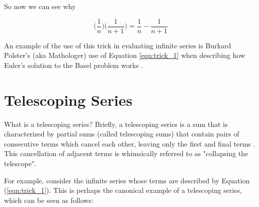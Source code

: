 \documentclass{article}
\theoremstyle{definition}
\begin{document}
\bigskip
\noindent
So now we can see why


\begin{equation}
\bigg ( \frac{1}{n} \bigg ) \bigg ( \frac{1}{n+1} \bigg ) =
\frac{1}{n} - \frac{1}{n+1} 
\label{eqn:trick_1}
\end{equation}

% 
%
% 
% 
% 

\medskip
\bigskip
\noindent
An example of the use of this trick in evaluating infinite series
is Burkard Polster's (aka Mathologer) use of Equation
\ref{eqn:trick_1} when describing how Euler's solution to the
Basel problem works \cite{mathologer:eulers_real_identity,notes:basel_problem}.


\section{Telescoping Series}
\label{sec:telescoping_series}
What is a telescoping series? Briefly, a telescoping series is a
sum that is characterized by partial sums (called telescoping
sums) that contain pairs of consecutive terms which cancel each
other, leaving only the first and final terms
\cite{wiki:telescoping_series}.  This cancellation of adjacent
terms is whimsically referred to as "collapsing the telescope".

\bigskip
\noindent
For example, consider the infinite series whose terms are
described by Equation (\ref{eqn:trick_1}). This is perhaps the
canonical example of a telescoping series, which can be seen as
follows:
\end{document}
